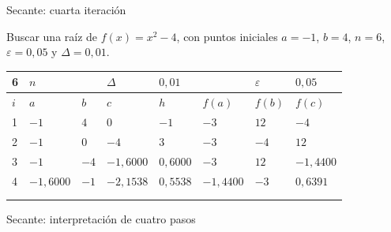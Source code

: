 \documentclass[main.tex]{subfiles}
\begin{document}
\begin{frame}[t]{Secante: cuarta iteración}
\begin{minipage}[t][13mm][t]{\textwidth}\small Buscar una raíz de $f(x)=x^2-4$, con puntos iniciales $a=-1$, $b=4$, $n=6$, $\varepsilon=0{,}05$ y $\Delta=0{,}01$.\end{minipage}\par{\scriptsize\setlength{\tabcolsep}{2pt}\renewcommand{\arraystretch}{1}\begin{center}\begin{tabular}{|C{.04\textwidth}|C{.112\textwidth}|C{.112\textwidth}|C{.112\textwidth}|C{.112\textwidth}|C{.112\textwidth}|C{.112\textwidth}|C{.112\textwidth}|}
\hline
\rule{0pt}{4.3mm}6 & $n$ &  &  $\Delta$  & $0{,}01$ &  & $\varepsilon$ & $0{,}05$\\\hline
\rule{0pt}{4.3mm}$i$ & $a$ & $b$ & $c$ & $h$ & $f(a)$ & $f(b)$ & $f(c)$\\\hline
\rule{0pt}{4.3mm}1 & $-1$ & $4$ & $0$ & $-1$ & $-3$ & $12$ & $-4$\\\hline
\rule{0pt}{4.3mm}2 & $-1$ & $0$ & $-4$ & $3$ & $-3$ & $-4$ & $12$\\\hline
\rule{0pt}{4.3mm}3 & $-1$ & $-4$ & $-1{,}6000$ & $0{,}6000$ & $-3$ & $12$ & $-1{,}4400$\\\hline
\rule{0pt}{4.3mm}4 & $-1{,}6000$ & $-1$ & $-2{,}1538$ & $0{,}5538$ & $-1{,}4400$ & $-3$ & $0{,}6391$\\\hline
\rule{0pt}{4.3mm} &  &  &  &  &  &  & \\\hline
\rule{0pt}{4.3mm} &  &  &  &  &  &  & \\\hline
\end{tabular}\end{center}}\begin{minipage}[t][10mm][t]{\textwidth}\footnotesize \end{minipage}
\end{frame}

\begin{frame}{Secante: interpretación de cuatro pasos}
\end{frame}
\end{document}
